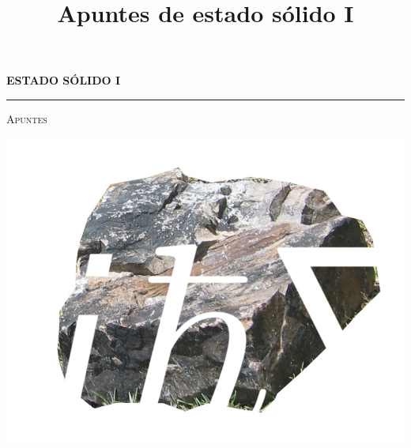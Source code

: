 \documentclass[a4paper,11pt]{book}
\title{Apuntes de estado sólido I}
\author{}
\newcommand{\kb}{k_{\scriptscriptstyle{B}}}
\begin{document}


\begin{titlepage}
	\centering
	{\bfseries\LARGE ESTADO SÓLIDO I\par}
	\vspace{0.7cm}
        \hrule
	\vspace{1cm}
	{\scshape\Large Apuntes \par}
	\vspace{5cm}
	\includegraphics[width=\textwidth]{cover.jpg}
	\vfill
\end{titlepage}



\tableofcontents
\listoffigures




\vfill
\vspace{10cm}
{}







\appendix

\end{document}
